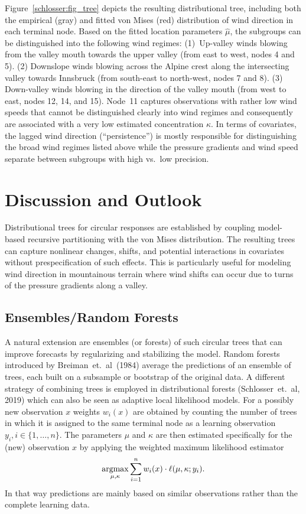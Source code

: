 \documentclass[twoside]{report}
\begin{document}
Figure~\ref{schlosser:fig_tree} depicts the resulting distributional tree, including
both the empirical (gray) and fitted von Mises (red) distribution of wind direction
in each terminal node. Based on the fitted location parameters $\hat \mu$, the subgroups
can be distinguished into the following wind regimes:
(1)~Up-valley winds blowing from the valley mouth towards the upper valley
(from east to west, nodes 4 and 5). (2) Downslope winds blowing across
the Alpine crest along the intersecting valley towards Innsbruck (from south-east to
north-west, nodes 7 and 8). (3) Down-valley winds blowing in the direction
of the valley mouth (from west to east, nodes 12, 14, and 15). Node~11
captures observations with rather low wind speeds that cannot be distinguished
clearly into wind regimes and consequently are associated with a very low
estimated concentration $\hat \kappa$. In terms of covariates, the lagged
wind direction (``persistence'') is mostly responsible for distinguishing
the broad wind regimes listed above while the pressure gradients and wind
speed separate between subgroups with high vs.\ low precision.

\section{Discussion and Outlook}

Distributional trees for circular responses are established by coupling
model-based recursive partitioning with the von Mises distribution.
The resulting trees can capture nonlinear changes, shifts, and potential interactions
in covariates without prespecification of such effects. This is particularly
useful for modeling wind direction in mountainous terrain where wind shifts
can occur due to turns of the pressure gradients along a valley.

\subsection{Ensembles/Random Forests}
A natural extension are ensembles (or forests) of such circular trees
that can improve forecasts by regularizing and stabilizing the model.
Random forests introduced by Breiman~et.~al~(1984) average the
predictions of an ensemble of trees, each built on a subsample 
or bootstrap of the original data. 
A different strategy of combining trees is employed in distributional forests 
(Schlosser~et.~al, 2019) which can also be seen as adaptive local likelihood models. 
For a possibly new observation $x$ weights $w_i(x)$ are obtained by counting the 
number of trees in which it is assigned to the same terminal node as a learning
observation $y_i, i \in \{1,\ldots,n\}$.
The parameters $\mu$ and $\kappa$ are then estimated specifically for the (new) 
observation $x$ by applying the weighted maximum likelihood estimator
$$
\operatorname{argmax}\displaylimits_{\mu, \kappa} \sum_{i=1}^n w_i(x) \cdot \ell(\mu, \kappa; y_i). 
$$
In that way predictions are mainly based on similar observations rather than the 
complete learning data.
\end{document}
